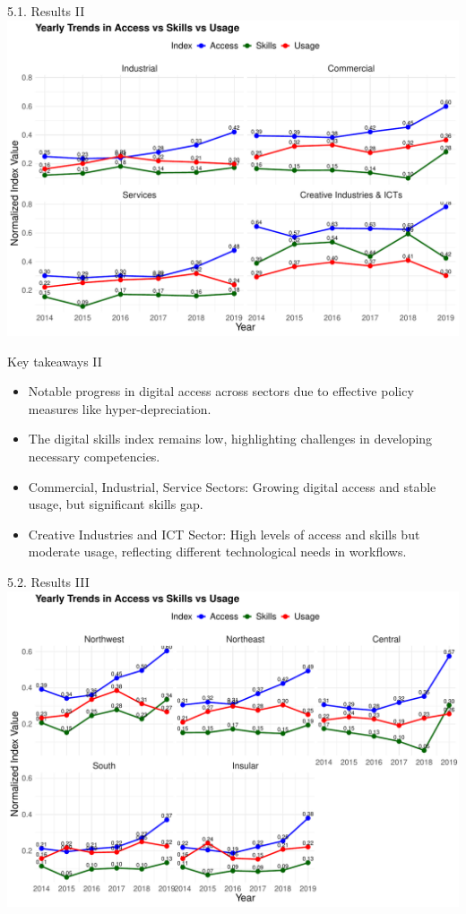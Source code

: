 \documentclass[
  ignorenonframetext,
]{beamer}
\begin{document}
\begin{frame}{5.1. Results II}
\label{results-ii}
\includegraphics{FactoAnalysisDigitalDivide_files/figure-beamer/yearTrendMac-1.pdf}
\end{frame}

\begin{frame}{Key takeaways II}
\label{key-takeaways-ii}
\begin{itemize}
\item
  Notable progress in digital access across sectors due to effective
  policy measures like hyper-depreciation.
\item
  The digital skills index remains low, highlighting challenges in
  developing necessary competencies.
\item
  Commercial, Industrial, Service Sectors: Growing digital access and
  stable usage, but significant skills gap.
\item
  Creative Industries and ICT Sector: High levels of access and skills
  but moderate usage, reflecting different technological needs in
  workflows.
\end{itemize}
\end{frame}

\begin{frame}{5.2. Results III}
\label{results-iii}
\includegraphics{FactoAnalysisDigitalDivide_files/figure-beamer/yearTrendReg-1.pdf}
\end{frame}
\end{document}
